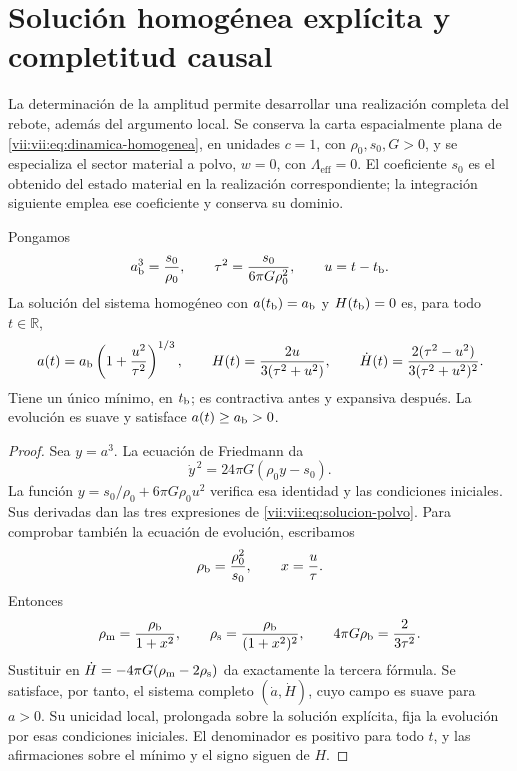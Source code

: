 \section{Solución homogénea explícita y completitud causal}
\label{vii:vii:sec:solucion-homogenea}
La determinación de la amplitud permite desarrollar una realización
completa del rebote, además del argumento local. Se conserva la carta
espacialmente plana de \eqref{vii:vii:eq:dinamica-homogenea}, en unidades
\(c=1\), con \(\rho_0,s_0,G>0\), y se especializa el sector material
a polvo, \(w=0\), con \(\Lambda_{\mathrm{eff}}=0\).
El coeficiente \(s_0\) es el obtenido del estado
material en la realización correspondiente; la integración siguiente
emplea ese coeficiente y conserva su dominio.

\begin{theorem}
\label{vii:vii:thm:rebote-polvo}
Pongamos
\[
 a_{\rm b}^3=\frac{s_0}{\rho_0},\qquad
 \tau^2=\frac{s_0}{6\pi G\rho_0^2},\qquad u=t-t_{\rm b}.
\]
La solución del sistema homogéneo con
\(a(t_{\rm b})=a_{\rm b}\) y \(H(t_{\rm b})=0\) es, para todo
\(t\in\mathbb R\),
\begin{equation}
 a(t)=a_{\rm b}\left(1+\frac{u^2}{\tau^2}\right)^{1/3},
 \qquad H(t)=\frac{2u}{3(\tau^2+u^2)},\qquad
 \dot H(t)=\frac{2(\tau^2-u^2)}{3(\tau^2+u^2)^2}.
 \label{vii:vii:eq:solucion-polvo}
\end{equation}
Tiene un único mínimo, en \(t_{\rm b}\); es contractiva antes y
expansiva después. La evolución es suave y satisface
\(a(t)\geq a_{\rm b}>0\).
\end{theorem}
\begin{proof}
Sea \(y=a^3\). La ecuación de Friedmann da
\[
 \dot y^{\,2}=24\pi G(\rho_0y-s_0).
\]
La función \(y=s_0/\rho_0+6\pi G\rho_0u^2\) verifica esa
identidad y las condiciones iniciales. Sus derivadas dan las
tres expresiones de \eqref{vii:vii:eq:solucion-polvo}. Para comprobar
también la ecuación de evolución, escribamos
\[
 \rho_{\rm b}=\frac{\rho_0^2}{s_0},\qquad
 x=\frac{u}{\tau}.
\]
Entonces
\[
 \rho_{\rm m}=\frac{\rho_{\rm b}}{1+x^2},\qquad
 \rho_{\rm s}=\frac{\rho_{\rm b}}{(1+x^2)^2},\qquad
 4\pi G\rho_{\rm b}=\frac{2}{3\tau^2}.
\]
Sustituir en \(\dot H=-4\pi G(\rho_{\rm m}-2\rho_{\rm s})\)
da exactamente la tercera fórmula. Se satisface, por tanto,
el sistema completo \((\dot a,\dot H)\), cuyo campo es suave
para \(a>0\). Su unicidad local, prolongada sobre la solución
explícita, fija la evolución por esas condiciones iniciales.
El denominador es positivo para todo \(t\), y las afirmaciones
sobre el mínimo y el signo siguen de \(H\).
\end{proof}

